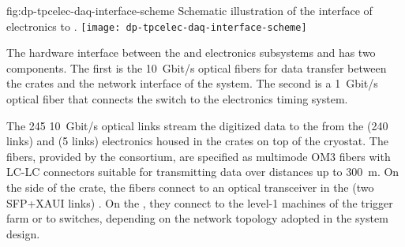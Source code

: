 \begin{dunefigure}{fig:dp-tpcelec-daq-interface-scheme}
{Schematic illustration of the interface of   electronics to .}
\texttt{[image: dp-tpcelec-daq-interface-scheme]}
\end{dunefigure}

The hardware interface between the \dual {} and  electronics subsystems and  has two components. The first %
is the \SI{10}{Gbit/s} optical fibers for data transfer between the  crates and the network interface of the  system. The second %
is a \SI{1}{Gbit/s} optical fiber that connects the   switch to the \dual electronics timing system.   

The \num{245} \SI{10}{Gbit/s} optical links stream the digitized data to the  from the  (\num{240} links) and  (\num{5} links) electronics housed in  the  crates on top of the cryostat.  The fibers, provided by the  consortium, are specified as multimode OM3 fibers \cite{om3fibers} with LC-LC connectors suitable for transmitting data over distances up to \SI{300}{\metre}.   On the side of the  crate, the fibers connect to an optical transceiver in the  (two SFP+XAUI links) \cite{natmch}.  On the , they connect to the level-1 machines of the trigger farm or to switches, depending on the network topology adopted in the  system design.

